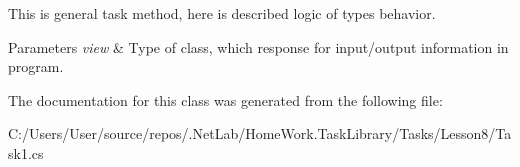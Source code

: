 This is general task method, here is described logic of types behavior. 


\begin{DoxyParams}{Parameters}
{\em view} & Type of class, which response for input/output information in program.\\
\hline
\end{DoxyParams}


The documentation for this class was generated from the following file\+:\begin{DoxyCompactItemize}
\item 
C\+:/\+Users/\+User/source/repos/.\+Net\+Lab/\+Home\+Work.\+Task\+Library/\+Tasks/\+Lesson8/Task1.\+cs\end{DoxyCompactItemize}

